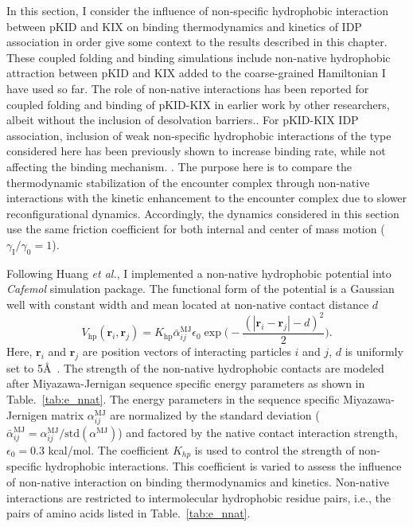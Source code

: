 \documentclass[../talant.diss.submit.tex]{subfiles}
\begin{document}
In this section, I  consider the influence of non-specific
hydrophobic interaction between pKID and KIX on binding
thermodynamics and kinetics of IDP association in order give some context to the results
described in this chapter. These
coupled folding and binding simulations include non-native
hydrophobic attraction between pKID and KIX added to the coarse-grained Hamiltonian I have used
so far. 
The role of non-native interactions has been reported for coupled folding and binding
of pKID-KIX in earlier work by other researchers, albeit without the inclusion of desolvation
barriers.\cite{huang:10a,turjanski:08}.
For pKID-KIX IDP association, inclusion of weak non-specific hydrophobic interactions of the type
considered here
has been previously shown to increase
binding rate, while not affecting the binding mechanism. \cite{huang:10a,turjanski:08}. 
The purpose here is to compare the thermodynamic stabilization of the encounter complex
through non-native interactions with the kinetic enhancement to the encounter complex due to slower
reconfigurational dynamics. Accordingly, the dynamics considered in this section use the
same friction coefficient for both internal and center of mass motion ($\gamma_\mathrm{I}/\gamma_0 = 1$).

Following Huang \textit{et al.},\cite{huang:10a} I implemented a non-native
hydrophobic potential into \textit{Cafemol} simulation package. The functional
form of the potential is a Gaussian well with constant width and mean located at
non-native contact distance $d$
%
%
\begin{equation}
  \label{eq:U_nnat}
  V_{\mathrm{hp}}(\bm{r}_i,\bm{r}_j) = K_{\mathrm{hp}} \bar{\alpha}_{ij}^{\mathrm{MJ}} \epsilon_{\mathrm{0}}
  \exp{ \Big(- \frac{( |\bm{r}_i - \bm{r}_j| - d )^2}{2} \Big )}.
\end{equation}
%
%
Here, $\bm{r}_i$ and  $\bm{r}_j$ are position vectors of interacting particles $i$ and $j$,
$d$ is uniformly set to 5\AA~. The strength of the non-native hydrophobic contacts are modeled after
Miyazawa-Jernigan\cite{miyazawa:99s}
sequence specific energy parameters as shown in Table.~\ref{tab:e_nnat}. 
The energy parameters in the sequence specific
Miyazawa-Jernigen matrix $\alpha_{ij}^{\mathrm{MJ}}$ are normalized by the standard deviation
($\bar{\alpha}_{ij}^{\mathrm{MJ}}=\alpha_{ij}^{\mathrm{MJ}}/\mathrm{std}(\alpha^{\mathrm{MJ}})$) and
factored by the native contact interaction strength, $\epsilon_0 = 0.3$ kcal/mol. The
coefficient $K_{hp}$ is used to control the strength of non-specific hydrophobic interactions.
This coefficient is varied to assess the influence of non-native interaction on
binding thermodynamics and kinetics.
Non-native interactions are restricted to intermolecular hydrophobic residue pairs,
i.e., the pairs of amino acids listed in Table.~\ref{tab:e_nnat}.
\end{document}
